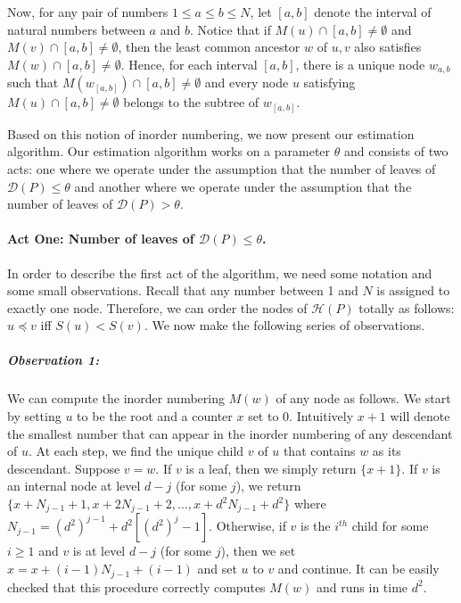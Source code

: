 Now, for any pair of numbers $1 \le a \le b \le N$, let $[a,b]$ denote the interval of natural numbers between $a$ and $b$. Notice that if $M(u) \cap [a,b] \neq \emptyset$
and $M(v) \cap [a,b] \neq \emptyset$, then the least common ancestor $w$ of $u,v$ also satisfies $M(w) \cap [a,b] \neq \emptyset$. Hence, for each interval $[a,b]$, there
is a unique node $w_{a,b}$ such that $M(w_{[a,b]}) \cap [a,b] \neq \emptyset$ and 
every node $u$ satisfying $M(u) \cap [a,b] \neq \emptyset$ belongs to the subtree of $w_{[a,b]}$. 

Based on this notion of inorder numbering, we now present our estimation algorithm. Our estimation algorithm works on a parameter $\theta$ and consists of two acts: one where we operate under the assumption that the number of leaves of $\mathcal{D}(P) \le \theta$ and another where we operate under the assumption that the number of leaves of $\mathcal{D}(P) > \theta$.

\paragraph{Act One: Number of leaves of $\mathcal{D}(P) \le \theta$. }
In order to describe the first act of the algorithm, we need some notation and some small observations. Recall that any number between 1 and $N$ is assigned to exactly one node. Therefore, we can order the nodes of $\mathcal{H}(P)$ totally as follows:
$u \preceq v$ iff $S(u) < S(v)$. We now make the following series of observations.


\subparagraph*{Observation 1: } We can compute the inorder numbering $M(w)$ of any node as follows. We start by setting $u$ to be the root and a counter $x$ set to 0. Intuitively $x+1$ will denote the smallest number that can appear in the inorder numbering of any descendant of $u$.
At each step, we find the unique child $v$ of $u$ that contains $w$ as its descendant.
Suppose $v = w$. If $v$ is a leaf, then we simply return $\{x+1\}$.
If $v$ is an internal node at level $d-j$ (for some $j$), we return $\{x + N_{j-1} + 1, x + 2 N_{j-1} + 2, \dots, x + d^2 N_{j-1} + d^2\}$ where $N_{j-1} = (d^2)^{j-1} + d^2 [(d^2)^j - 1]$. Otherwise, if $v$ is the $i^{th}$ child for some $i \ge 1$ and $v$ is at level $d-j$ (for some $j$), then we set $x = x + (i-1) N_{j-1} + (i-1)$ and set $u$ to $v$ and continue. It can be easily checked that this procedure correctly computes $M(w)$ and 
runs in time $d^2$.


